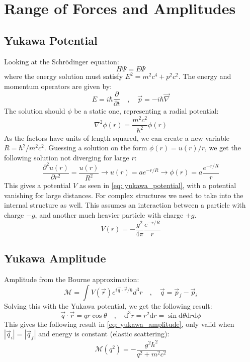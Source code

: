 \section{Range of Forces and Amplitudes}
\subsection{Yukawa Potential}
Looking at the Schrödinger equation:
\begin{equation}
  H Ψ = E Ψ
\end{equation}
where the energy solution must satisfy $E^2 = m^2c^{4} + p^2c^2$.  The energy and momentum operators are given by:
\begin{equation}
    E = iℏ \frac{∂}{∂t} \quad , \quad \vec{p} = -iℏ \vec{∇}
\end{equation}
The solution should $ϕ$ be a static one, representing a radial potential:
\begin{equation}
  ∇^2ϕ(r) = \frac{m^2c^2}{ℏ^2} ϕ(r)
\end{equation}
As the factors have units of length squared, we can create a new variable $R = ℏ^2 / m^2c^2$. Guessing a solution on the form $ϕ(r) = u(r) / r$, we get the following solution not diverging for large $r$:
\begin{equation}
  \frac{∂^2 u(r)}{∂ r^2} = \frac{u(r)}{R^2} →  u(r) = ae^{-r / R} →  ϕ(r) = a \frac{e^{-r / R}}{r}
\end{equation}
This gives a potential $V$ as seen in \cref{eq: yukawa_potential}, with a potential vanishing for large distances. For complex structures we need to take into the internal structure as well. This assumes an interaction between a particle with charge $-g$, and another much heavier particle with charge $+g$.
\begin{equation}\label{eq: yukawa_potential}
  V(r) = -\frac{g^2}{4π} \frac{e^{-r / R}}{r}
\end{equation}

\subsection{Yukawa Amplitude}
Amplitude from the Bourne approximation:
\begin{equation}
  \mathcal{M} = ∫ V(\vec{r}) e^{i \vec{q} ⋅ \vec{r} / ℏ} d^3r  \quad , \quad  \vec{q} = \vec{p}_f - \vec{p}_i
\end{equation}
Solving this with the Yukawa potential, we get the following result:
\begin{equation}
  \vec{q} ⋅ \vec{r} = qr \cos θ \quad , \quad  \mathrm{d}^3r = r^2 \mathrm{d}r = \sin \mathrm{d}θ \mathrm{d}r \mathrm{d}ϕ
\end{equation}
This gives the following result in \cref{eq: yukawa_amplitude}, only valid when $\left|\vec{q}_i\right| = \left|\vec{q}_f\right|$ and energy is constant (elastic scattering):
\begin{equation}\label{eq: yukawa_amplitude}
  \mathcal{M}(q^2) = - \frac{g^2 ℏ^2}{q^2 + m^2c^2}
\end{equation}

